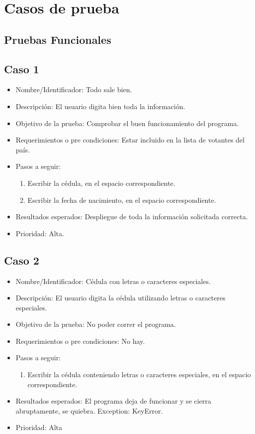 \documentclass[conference]{IEEEtran}
\begin{document}
\section{Casos de prueba}
\subsection{Pruebas Funcionales}
\subsection*{Caso 1}
\begin{itemize}
\item Nombre/Identificador: Todo sale bien.
\item Descripción: El usuario digita bien toda la información.
\item Objetivo de la prueba: Comprobar el buen funcionamiento del programa.
\item Requerimientos o pre condiciones: Estar incluido en la lista de votantes del país.
\item Pasos a seguir: 
\begin{enumerate}
\item Escribir la cédula, en el espacio correspondiente.
\item Escribir la fecha de nacimiento, en el espacio correspondiente.
\end{enumerate}
\item Resultados esperados: Despliegue de toda la información solicitada correcta.
\item Prioridad: Alta.
\end{itemize}
\subsection*{Caso 2}
\begin{itemize}
\item Nombre/Identificador: Cédula con letras o caracteres especiales.
\item Descripción: El usuario digita la cédula utilizando letras o caracteres especiales.
\item Objetivo de la prueba: No poder correr el programa.
\item Requerimientos o pre condiciones: No hay.
\item Pasos a seguir: 
\begin{enumerate}
\item Escribir la cédula conteniendo letras o caracteres especiales, en el espacio correspondiente.
\end{enumerate}
\item Resultados esperados: El programa deja de funcionar y se cierra abruptamente, se quiebra. Exception: KeyError.
\item Prioridad: Alta
\end{itemize}
\end{document}
